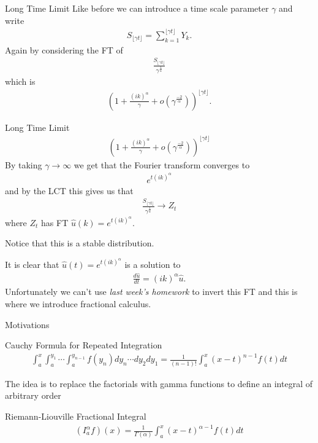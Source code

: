 \documentclass[pdf]{beamer}
\newcommand{\lra}{\longrightarrow}
\newcommand{\rli}[3]{ \left( I_{#1}^{#2} #3 \right) }
\begin{document}
\begin{frame}{Long Time Limit}
    Like before we can introduce a time scale parameter $ \gamma $ and write
    \begin{align}
        S_{\lfloor \gamma t \rfloor} = \sum_{k=1}^{\lfloor \gamma t \rfloor}Y_k.
    \end{align}
    Again by considering the FT of 
    \begin{align}
        \frac{S_{\lfloor \gamma t \rfloor}}{\gamma^\frac{1}{\alpha}}
    \end{align}
    which is
    \begin{align}
        \left( 1 + \frac{(ik)^\alpha}{\gamma} + o(\gamma^\frac{-2}{\alpha})\right)^{\lfloor \gamma t \rfloor}.
    \end{align}
\end{frame}

\begin{frame}{Long Time Limit}
    \begin{align}
            \left( 1 + \frac{(ik)^\alpha}{\gamma} + o(\gamma^\frac{-2}{\alpha})\right)^{\lfloor \gamma t \rfloor}
        \end{align}
        By taking $ \gamma \lra \infty $ we get that the Fourier transform converges to
        \begin{align}
            e^{t(ik)^\alpha}
        \end{align}
    and by the LCT this gives us that 
    \begin{align}
        \frac{S_{\lfloor \gamma t \rfloor}}{\gamma^\frac{1}{\alpha}} \lra Z_t
    \end{align}
    where $ Z_t $ has FT $ \hat{u}(k) = e^{t(ik)^\alpha} $.
    
    Notice that this is a stable distribution.
\end{frame}
\begin{frame}
    It is clear that $ \hat{u}(t) = e^{t(ik)^\alpha} $ is a solution to
    \begin{align}
        \frac{d\hat{u}}{dt} = (ik)^\alpha \hat{u}.
    \end{align}
    Unfortunately we can't use \emph{last week's homework} to invert this FT and this is where we introduce fractional calculus.
\end{frame}


\begin{frame}{Motivations}
	\begin{block}{Cauchy Formula for Repeated Integration}
		\begin{align*}
			\int_{a}^{x} \int_{a}^{y_1} \cdots \int_a^{y_{n-1}} f(y_n) dy_n \cdots dy_2 dy_1 = \frac{1}{(n-1)!} \int_a^x(x-t)^{n-1}f(t)dt
		\end{align*}
	\end{block}
	\pause
	The idea is to replace the factorials with gamma functions to define an integral of arbitrary order
	\pause
	\begin{block}{Riemann-Liouville Fractional Integral}
		\begin{align*}
			\rli{a}{\alpha}{f}(x) = \frac{1}{\Gamma(\alpha)} \int_a^x(x-t)^{\alpha-1}f(t)dt
		\end{align*}
	\end{block}
\end{frame}
\end{document}
